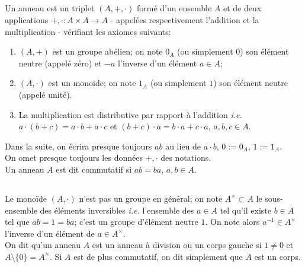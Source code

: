 \documentclass[a4paper, oneside, 12pt]{book}
\theoremstyle{definition} %
\newcommand{\ie}{\textit{i.e.}} %
\begin{document}
\subsection{}Un anneau est  un triplet $(A,+,\cdot)$ formé d'un ensemble $A$ et de deux applications $+,\cdot :A\times A\rightarrow A$ - appelées respectivement l'addition et la multiplication -  vérifiant les axiomes suivants:
\begin{enumerate}
\item $(A,+)$ est un groupe abélien; on note $0_A$ (ou simplement $0$) son élément neutre (appelé zéro) et $-a$ l'inverse d'un élément $a\in A$;
\item $(A ,\cdot)$ est un monoïde; on note $1_A$ (ou simplement $1$) son élément neutre (appelé unité). 
\item La multiplication est distributive par rapport à l'addition \ie{} $a\cdot (b+c)=a\cdot b+a\cdot c$ et $(b+c)\cdot a=b\cdot a+c\cdot a$, $a,b,c\in A$.\\
\end{enumerate}
 Dans la suite, on écrira presque toujours $ab$ au lieu de $a\cdot b$, $0:=0_A$, $1:=1_A$.\\ 

 On omet presque toujours les données $+,\cdot$ des notations.\\


 Un anneau $A$ est dit commutatif si    $a b=ba$, $a,b\in A$. \\


\subsection{}Le monoïde $(A ,\cdot)$ n'est pas un groupe en général; on note $A^\times\subset A $ le sous-ensemble des éléments inversibles \ie{} l'ensemble des $ a\in A$ tel qu'il existe $b\in A$ tel que $ab=1=ba$; c'est un groupe d'élément neutre $1$. On note alors $a^{-1}\in A^\times$ l'inverse d'un élément de $a\in A^\times$.\\


 On dit qu'un anneau $A$ est un anneau à division ou un corps gauche si $1\not=0$ et $A\setminus \lbrace 0\rbrace=A^\times$. Si $A$ est de plus commutatif, on dit simplement que $A$ est un corps.\\
\end{document}
